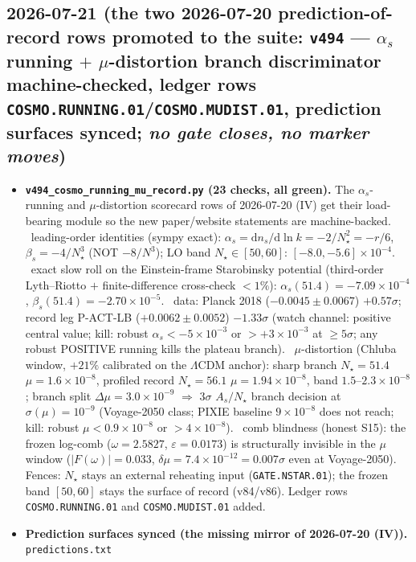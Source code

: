 \subsection*{2026-07-21 (the two 2026-07-20 prediction-of-record rows promoted to the suite: \texttt{v494} --- $\alpha_s$ running $+$ $\mu$-distortion branch discriminator machine-checked, ledger rows \texttt{COSMO.RUNNING.01}/\texttt{COSMO.MUDIST.01}, prediction surfaces synced; \emph{no gate closes, no marker moves})}
\begin{itemize}[leftmargin=1.5em]
\item \textbf{\texttt{v494\_cosmo\_running\_mu\_record.py} (23 checks, all green).} The $\alpha_s$-running and
$\mu$-distortion scorecard rows of 2026-07-20 (IV) get their load-bearing module so the new paper/website
statements are machine-backed. \mE\ leading-order identities (sympy exact):
$\alpha_s=\mathrm dn_s/\mathrm d\ln k=-2/N_\star^2=-r/6$, $\beta_s=-4/N_\star^3$ (NOT $-8/N^3$); LO band
$N_\star\in[50,60]$: $[-8.0,-5.6]\times10^{-4}$. \mE\ exact slow roll on the Einstein-frame Starobinsky
potential (third-order Lyth--Riotto $+$ finite-difference cross-check $<1\%$):
$\alpha_s(51.4)=-7.09\times10^{-4}$, $\beta_s(51.4)=-2.70\times10^{-5}$. \mC\ data: Planck 2018
($-0.0045\pm0.0067$) $+0.57\sigma$; record leg P-ACT-LB ($+0.0062\pm0.0052$) $-1.33\sigma$ (watch channel:
positive central value; kill: robust $\alpha_s<-5\times10^{-3}$ or $>+3\times10^{-3}$ at $\ge5\sigma$; any
robust POSITIVE running kills the plateau branch). \mC\ $\mu$-distortion (Chluba window, $+21\%$ calibrated
on the $\Lambda$CDM anchor): sharp branch $N_\star{=}51.4$ $\mu=1.6\times10^{-8}$, profiled record
$N_\star{=}56.1$ $\mu=1.94\times10^{-8}$, band $1.5$--$2.3\times10^{-8}$; branch split
$\Delta\mu=3.0\times10^{-9}$ $\Rightarrow$ $3\sigma$ $A_s/N_\star$ branch decision at
$\sigma(\mu)=10^{-9}$ (Voyage-2050 class; PIXIE baseline $9\times10^{-8}$ does not reach; kill: robust
$\mu<0.9\times10^{-8}$ or $>4\times10^{-8}$). \mE\ comb blindness (honest S15): the frozen log-comb
($\omega=2.5827$, $\varepsilon=0.0173$) is structurally invisible in the $\mu$ window
($|F(\omega)|=0.033$, $\delta\mu=7.4\times10^{-12}=0.007\sigma$ even at Voyage-2050). Fences: $N_\star$
stays an external reheating input (\texttt{GATE.NSTAR.01}); the frozen band $[50,60]$ stays the surface of
record (v84/v86). Ledger rows \texttt{COSMO.RUNNING.01} and \texttt{COSMO.MUDIST.01} added.
\item \textbf{Prediction surfaces synced (the missing mirror of 2026-07-20 (IV)).} \texttt{predictions.txt}

\end{itemize}
